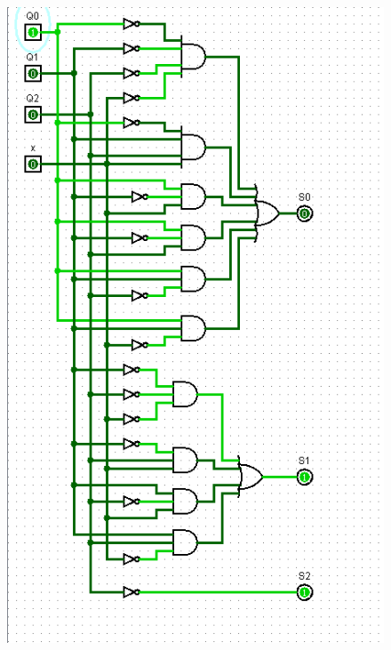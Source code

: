 \documentclass[]{article}
\begin{document}
\begin{minipage}{0.5\textwidth}
\begin{figure}[H]
	\centering
	\includegraphics[width=1\textwidth]{test0_4.png}
\end{figure}
\end{minipage}
\end{document}
